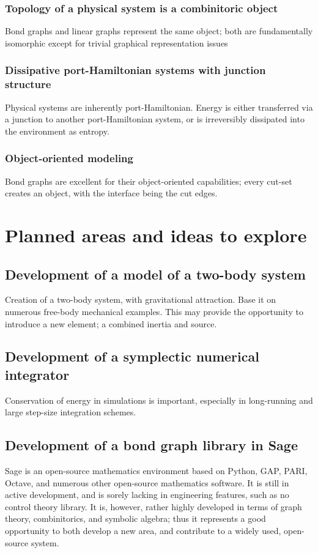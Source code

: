 \documentclass[utf,a4paper,12pt]{report}
\begin{document}
\subsection{Topology of a physical system is a combinitoric object}
Bond graphs and linear graphs represent the same object; both are fundamentally isomorphic except for trivial graphical representation issues
\subsection{Dissipative port-Hamiltonian systems with junction structure}
Physical systems are inherently port-Hamiltonian. Energy is either transferred via a junction to another port-Hamiltonian system, or is irreversibly dissipated into the environment as entropy.
\subsection{Object-oriented modeling}
Bond graphs are excellent for their object-oriented capabilities; every cut-set creates an object, with the interface being the cut edges.
\chapter{Planned areas and ideas to explore}
\section{Development of a model of a two-body system}
Creation of a two-body system, with gravitational attraction. Base it on numerous free-body mechanical examples. This may provide the opportunity to introduce a new element; a combined inertia and source. 
\section{Development of a symplectic numerical integrator}
Conservation of energy in simulations is important, especially in long-running and large step-size integration schemes.
\section{Development of a bond graph library in Sage}
Sage is an open-source mathematics environment based on Python, GAP, PARI, Octave, and numerous other open-source mathematics software. It is still in active development, and is sorely lacking in engineering features, such as no control theory library. It is, however, rather highly developed in terms of graph theory, combinitorics, and symbolic algebra; thus it represents a good opportunity to both develop a new area, and contribute to a widely used, open-source system.
\end{document}
